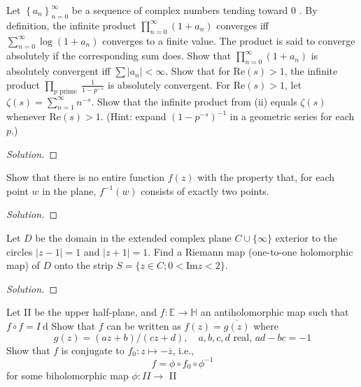 \documentclass[10pt]{article}
\newenvironment{soln}{\begin{proof}[Solution]}{\end{proof}}
\begin{document}
\begin{problem}
[2002 J-I-4]
Let $\left\{a_n\right\}_{n=0}^{\infty}$ be a sequence of complex numbers tending toward 0 . By definition, the infinite product $\prod_{n=0}^{\infty}\left(1+a_n\right)$ converges iff $\sum_{n=0}^{\infty} \log \left(1+a_n\right)$ converges to a finite value. The product is said to converge absolutely if the corresponding sum does. Show that $\prod_{n=0}^{\infty}\left(1+a_n\right)$ is absolutely convergent iff $\sum\left|a_n\right|<\infty$. Show that for $\text{Re}(s)>1$, the infinite product $\prod_{p \text { prime }} \frac{1}{1-p^{-s}}$ is absolutely convergent. For $\text{Re}(s)>1$, let $\zeta(s)=\sum_{n=1}^{\infty} n^{-s}$. Show that the infinite product from (ii) equals $\zeta(s)$ whenever $\text{Re}(s)>1$. (Hint: expand $\left(1-p^{-s}\right)^{-1}$ in a geometric series for each $p$.)
\end{problem}

\begin{soln}

\end{soln}



\begin{problem}
[2002 J-II-2]
Show that there is no entire function $f(z)$ with the property that, for each point $w$ in the plane, $f^{-1}(w)$ consists of exactly two points.
\end{problem}

\begin{soln}

\end{soln}



\begin{problem}
[2002 A-I-5]
Let $D$ be the domain in the extended complex plane $C \cup\{\infty\}$ exterior to the circles $|z-1|=1$ and $|z+1|=1$. Find a Riemann map (one-to-one holomorphic map) of $D$ onto the strip $S=\{z \in C ; 0<\text{Im} z<2\}$.
\end{problem}

\begin{soln}

\end{soln}



\begin{problem}
[2002 A-II-2]
Let II be the upper half-plane, and $f: \mathbb{E} \rightarrow \mathbb{H}$ an antiholomorphic map such that $f \circ f=I \mathrm{~d}$ Show that $f$ can be written as $f(z)=\overline{g(z)}$ where
$$
g(z)=(a z+b) /(c z+d), \quad a, b, c, d \text { real, } a d-b c=-1
$$ Show that $f$ is conjugate to $f_0: z \mapsto-\bar{z}$, i.e.,
$$
f=\phi \circ f_0 \circ \phi^{-1}
$$
for some biholomorphic map $\phi: I I \rightarrow$ II
\end{problem}
\end{document}
